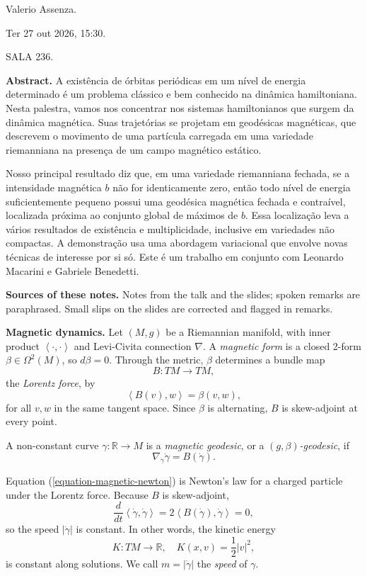 \noindent
Valerio Assenza.

Ter 27 out 2026, 15:30.

SALA 236.

\medskip\noindent
{\bf Abstract.} A existência de órbitas
periódicas em um nível de energia
determinado é um problema clássico e bem
conhecido na dinâmica hamiltoniana. Nesta
palestra, vamos nos concentrar nos sistemas
hamiltonianos que
surgem da dinâmica magnética. Suas
trajetórias se projetam em geodésicas
magnéticas, que descrevem o movimento de uma
partícula carregada em uma variedade
riemanniana na presença de um campo
magnético estático.

Nosso principal resultado diz que, em uma
variedade riemanniana fechada, se a
intensidade magnética $b$ não for
identicamente zero, então todo nível de
energia suficientemente pequeno possui uma
geodésica magnética fechada e contraível,
localizada próxima ao conjunto global de
máximos de $b$. Essa localização leva a
vários resultados de existência e
multiplicidade, inclusive em variedades não
compactas. A demonstração usa uma abordagem
variacional que envolve novas técnicas de
interesse por si só. Este é um trabalho em
conjunto com Leonardo Macarini e Gabriele
Benedetti.

\medskip\noindent
{\bf Sources of these notes.} Notes from the
talk and the slides; spoken remarks are
paraphrased. Small slips on the slides are
corrected and flagged in remarks.

\medskip\noindent
{\bf Magnetic dynamics.} Let $(M,g)$ be a
Riemannian manifold, with inner product
$\left\langle{} \cdot,\cdot \right\rangle{}$
and Levi-Civita connection $\nabla$. A
\emph{magnetic form} is a closed 2-form
$\beta \in \Omega^2(M)$, so $d\beta = 0$.
Through the metric, $\beta$ determines a
bundle map
$$
B : TM \to TM,
$$
the \emph{Lorentz force}, by
$$
\left\langle{} B(v),w \right\rangle{}
= \beta(v,w),
$$
for all $v,w$ in the same tangent space.
Since $\beta$ is alternating, $B$ is
skew-adjoint at every point.

A non-constant curve
$\gamma : \mathbb{R} \to M$ is a
\emph{magnetic geodesic}, or a
\emph{$(g,\beta)$-geodesic}, if
\begin{equation}
\label{equation-magnetic-newton}
\nabla_{\dot\gamma}\dot\gamma
= B(\dot\gamma).
\end{equation}

Equation (\ref{equation-magnetic-newton}) is
Newton's law for a charged particle under the
Lorentz force. Because $B$ is skew-adjoint,
$$
\frac{d}{dt}
\left\langle{} \dot\gamma,\dot\gamma
\right\rangle{}
= 2 \left\langle{} B(\dot\gamma),
\dot\gamma \right\rangle{}
= 0,
$$
so the speed $|\dot\gamma|$ is constant. In
other words, the kinetic energy
$$
K : TM \to \mathbb{R},
\quad
K(x,v) = \frac{1}{2}|v|^2,
$$
is constant along solutions. We call $m =
|\dot\gamma|$ the \emph{speed} of $\gamma$.

